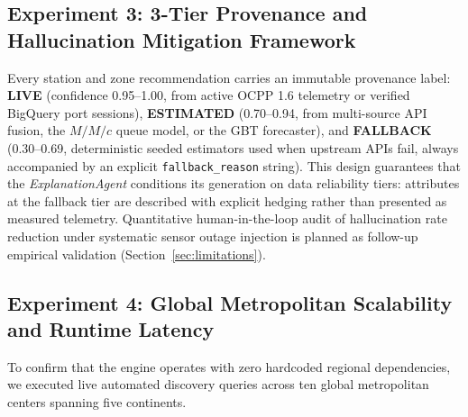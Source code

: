 \documentclass[preprint,12pt,authoryear]{elsarticle}
\begin{document}
\subsection{Experiment 3: 3-Tier Provenance and Hallucination Mitigation Framework}
\label{sec:provenance_eval}
Every station and zone recommendation carries an immutable provenance label: \textbf{LIVE} (confidence 0.95--1.00, from active OCPP 1.6 telemetry or verified BigQuery port sessions), \textbf{ESTIMATED} (0.70--0.94, from multi-source API fusion, the $M/M/c$ queue model, or the GBT forecaster), and \textbf{FALLBACK} (0.30--0.69, deterministic seeded estimators used when upstream APIs fail, always accompanied by an explicit \texttt{fallback\_reason} string). This design guarantees that the \textit{ExplanationAgent} conditions its generation on data reliability tiers: attributes at the fallback tier are described with explicit hedging rather than presented as measured telemetry. Quantitative human-in-the-loop audit of hallucination rate reduction under systematic sensor outage injection is planned as follow-up empirical validation (Section~\ref{sec:limitations}).

\subsection{Experiment 4: Global Metropolitan Scalability and Runtime Latency}
To confirm that the engine operates with zero hardcoded regional dependencies, we executed live automated discovery queries across ten global metropolitan centers spanning five continents. 

\begin{table}[htbp]
\centering
\caption{Zero-hardcoding global metropolitan scalability and latency profiling on Google Cloud Run.}
\label{tab:global_cities}
\end{table}
\end{document}
